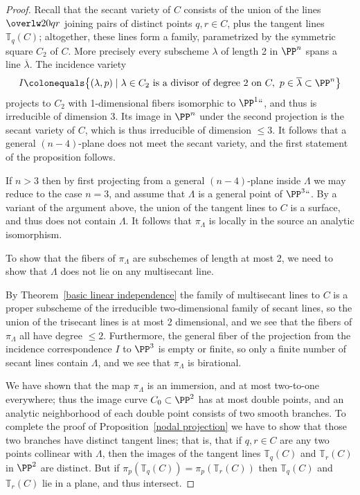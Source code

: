 \begin{proof} Recall that the 
secant variety
%
of $C$ consists of the
union of the lines $\overlw20{qr}$ joining pairs of distinct points
$q,r \in C$, plus the tangent lines ${\mathbb T}_q(C)$; altogether,
these lines form a family, parametrized by the symmetric square $C_2$
of $C$. More precisely every subscheme $\lambda$ of
length 2 in $\PP^n$ spans a line $\overline \lambda$. The incidence
variety
$$
I\colonequals \bigl\{(\lambda, p)\mid \lambda\in C_2 \hbox{ is a divisor of
degree 2 on }C,\ p\in \overline \lambda\subset\PP^n\bigr\}
$$
projects to $C_2$ with 1-dimensional fibers isomorphic to $\PP^1` `$,
and thus
is irreducible of dimension 3. Its image in $\PP^n$ under the second
projection
is the secant variety of $C$, which is thus irreducible of dimension
$\leq 3$.
It follows that a general
$(n-4)$-plane does not meet the secant variety, and the first statement
of the proposition follows.

If $n>3$ then by first projecting from a general $(n-4)$-plane inside
$\Lambda$ we may reduce to the case $n=3$, and assume that $\Lambda$ is a
general point of $\PP^3` `$. By a variant of the argument above, the union
of the tangent lines to $C$ is a surface, and thus does not contain
$\Lambda$.
It follows that $\pi_\Lambda$ is locally in the source an analytic
isomorphism.

To show that the fibers of $\pi_\Lambda$ are subschemes of length at
most 2,
we need to show that $\Lambda$ does not lie on any 
%
multisecant line.

By Theorem~\ref{basic linear independence} the family of multisecant
lines to $C$ is a proper subscheme of the irreducible two-dimensional
family of secant lines, so the union of the trisecant lines is at most 2
dimensional, and we see that the fibers of $\pi_\Lambda$ all have degree
$\leq 2$. Furthermore, the general fiber of the projection
from the incidence correspondence $I$ to $\PP^3$ is empty or finite,
so only a finite number of secant lines contain $\Lambda$, and we see
that $\pi_\Lambda$ is birational.

We have shown that the map $\pi_\Lambda$ is an immersion, and at
most two-to-one everywhere; thus the image curve $C_0 \subset \PP^2$
has at most double points, and an analytic neighborhood of each
double point  consists of two smooth branches. To complete the proof
of Proposition~\ref{nodal projection} we have to show that those two
branches have distinct tangent lines; that is, that
if $q, r \in C$ are any two points collinear with $\Lambda$, then the
images of the tangent lines ${\mathbb T}_q(C)$ and ${\mathbb T}_r(C)$ in
$\PP^2$ are distinct. But if  $\pi_p({\mathbb T}_q(C)) = \pi_p({\mathbb
T}_r(C))$ then  ${\mathbb T}_q(C)$ and ${\mathbb T}_r(C)$ lie in a plane,
and thus intersect.


\end{proof}
